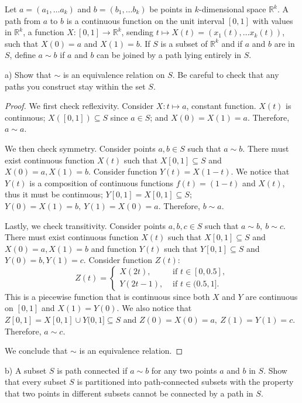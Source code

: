 \documentclass{article}
\theoremstyle{definition}
\newcommand{\R}{\mathbb{R}}
\begin{document}
\begin{tcolorbox}
Let $a = (a_1, \dots a_k)$ and $b = (b_1, \dots b_k)$ be points in $k$-dimensional space $\R^k$.
A path from $a$ to $b$ is a continuous function on the unit interval $[0,1]$ with values in $\R^k$, a function $X: [0,1] \to \R^k$, sending $t \mapsto X(t) = (x_1(t), \dots x_k(t))$, such that $X(0) = a$ and $X(1) = b$.
If $S$ is a subset of $\R^k$ and if $a$ and $b$ are in $S$, define $a \sim b$ if $a$ and $b$ can be joined by a path lying entirely in $S$.

a) Show that $\sim$ is an equivalence relation on $S$. Be careful to check that any paths you construct stay within the set $S$.
\end{tcolorbox}
\begin{proof}

We first check reflexivity.
Consider $X: t \mapsto a$, constant function.
$X(t)$ is continuous; $X([0,1]) \subseteq S$ since $a \in S$; and $X(0) = X(1) = a$.
Therefore, $a \sim a$.

We then check symmetry.
Consider points $a,b \in S$ such that $a \sim b$.
There must exist continuous function $X(t)$ such that $X[0,1] \subseteq S$ and $X(0) = a, X(1) = b$.
Consider function $Y(t) = X(1-t)$.
We notice that $Y(t)$ is a composition of continuous functions $f(t) = (1-t)$ and $X(t)$, thus it must be continuous; $Y[0,1] = X[0,1] \subseteq S$; $Y(0) = X(1) = b, \> Y(1) = X(0) = a$. Therefore, $b \sim a$.

Lastly, we check transitivity.
Consider points $a,b,c \in S$ such that $a \sim b, \> b \sim c$.
There must exist continuous function $X(t)$ such that $X[0,1] \subseteq S$ and $X(0) = a, X(1) = b$ and function $Y(t)$ such that $Y[0,1] \subseteq S$ and $Y(0) = b, Y(1) = c$. Consider function $Z(t)$:
\[
    Z(t) =
    \begin{cases}
        X(2t), & \text{ if $t \in [0, 0.5]$}, \\
        Y(2t-1), & \text{ if $t \in (0.5, 1]$}.
    \end{cases}
\]
This is a piecewise function that is continuous since both $X$ and $Y$ are continuous on $[0,1]$ and $X(1) = Y(0)$.
We also notice that $Z[0,1] = X[0,1] \cup Y(0,1] \subseteq S$ and $Z(0) = X(0) = a, \> Z(1) = Y(1) = c$.
Therefore, $a \sim c$.

We conclude that $\sim$ is an equivalence relation.

\end{proof}

\begin{tcolorbox}
b) A subset $S$ is path connected if $a \sim b$ for any two points $a$ and $b$ in $S$.
Show that every subset $S$ is partitioned into path-connected subsets with the property that two points in different subsets cannot be connected by a path in $S$.
\end{tcolorbox}
\end{document}
